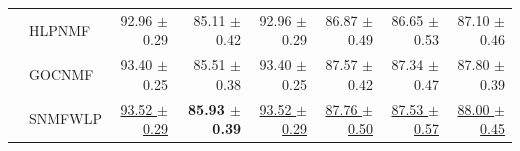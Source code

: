 \begin{tabular}{llrrrrrr}
 & HLPNMF & 92.96 $\pm$ 0.29 & 85.11 $\pm$ 0.42 & 92.96 $\pm$ 0.29 & 86.87 $\pm$ 0.49 & 86.65 $\pm$ 0.53 & 87.10 $\pm$ 0.46 \\
 & GOCNMF & 93.40 $\pm$ 0.25 & 85.51 $\pm$ 0.38 & 93.40 $\pm$ 0.25 & 87.57 $\pm$ 0.42 & 87.34 $\pm$ 0.47 & 87.80 $\pm$ 0.39 \\
 & SNMFWLP & \underline{93.52 $\pm$ 0.29} & \textbf{85.93 $\pm$ 0.39} & \underline{93.52 $\pm$ 0.29} & \underline{87.76 $\pm$ 0.50} & \underline{87.53 $\pm$ 0.57} & \underline{88.00 $\pm$ 0.45} \\
\bottomrule
\end{tabular}
